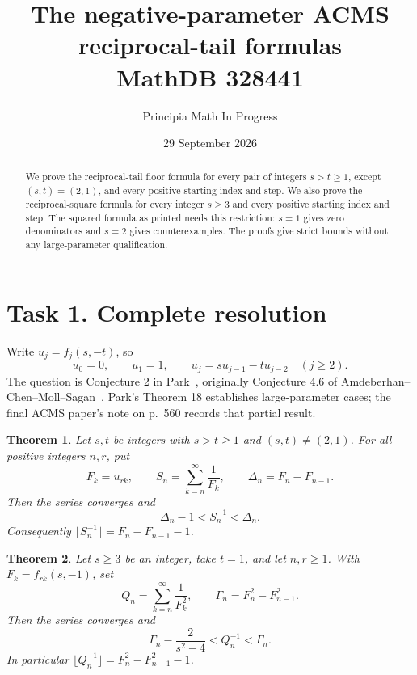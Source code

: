 \documentclass[11pt]{article}
\title{The negative-parameter ACMS reciprocal-tail formulas\\
\large MathDB 328441}
\author{Principia Math In Progress}
\date{29 September 2026}
\newtheorem{theorem}{Theorem}
\begin{document}
\maketitle
\begin{abstract}
We prove the reciprocal-tail floor formula for every pair of integers
$s>t\geq1$, except $(s,t)=(2,1)$, and every positive starting index and
step. We also prove the reciprocal-square formula for every integer
$s\geq3$ and every positive starting index and step. The squared formula
as printed needs this restriction: $s=1$ gives zero denominators and
$s=2$ gives counterexamples. The proofs give strict bounds without any
large-parameter qualification.
\end{abstract}

\section*{Task 1. Complete resolution}
Write $u_j=f_j(s,-t)$, so
\[
u_0=0,\qquad u_1=1,\qquad u_j=su_{j-1}-tu_{j-2}\quad(j\geq2).
\]
The question is Conjecture 2 in Park~\cite[p.~8]{Park}, originally
Conjecture 4.6 of Amdeberhan--Chen--Moll--Sagan~\cite[p.~556]{ACMS}.
Park's Theorem 18 establishes large-parameter cases; the final ACMS
paper's note on p.~560 records that partial result.

\begin{theorem}\label{thm:linear}
Let $s,t$ be integers with $s>t\geq1$ and $(s,t)\ne(2,1)$.
For all positive integers $n,r$, put
\[
F_k=u_{rk},\qquad S_n=\sum_{k=n}^{\infty}\frac1{F_k},
\qquad \Delta_n=F_n-F_{n-1}.
\]
Then the series converges and
\[
\Delta_n-1<S_n^{-1}<\Delta_n.
\]
Consequently $\lfloor S_n^{-1}\rfloor=F_n-F_{n-1}-1$.
\end{theorem}

\begin{theorem}\label{thm:squares}
Let $s\geq3$ be an integer, take $t=1$, and let $n,r\geq1$.
With $F_k=f_{rk}(s,-1)$, set
\[
Q_n=\sum_{k=n}^{\infty}\frac1{F_k^2},
\qquad \Gamma_n=F_n^2-F_{n-1}^2 .
\]
Then the series converges and
\[
\Gamma_n-\frac{2}{s^2-4}<Q_n^{-1}<\Gamma_n.
\]
In particular $\lfloor Q_n^{-1}\rfloor=F_n^2-F_{n-1}^2-1$.
\end{theorem}
\end{document}
